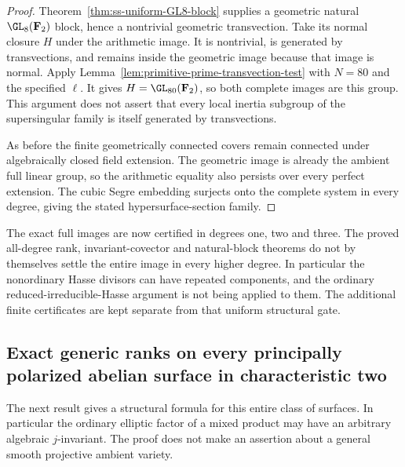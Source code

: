 \begin{proof}
Theorem~\ref{thm:ss-uniform-GL8-block} supplies a geometric natural
$\GL_8(\mathbf F_2)$ block, hence a nontrivial geometric transvection.
Take its normal closure $H$ under the arithmetic image. It is nontrivial,
is generated by transvections, and remains inside the geometric image
because that image is normal. Apply
Lemma~\ref{lem:primitive-prime-transvection-test} with $N=80$ and the
specified $\ell$. It gives $H=\GL_{80}(\mathbf F_2)$, so both complete
images are this group. This argument does not assert that every local
inertia subgroup of the supersingular family is itself generated by
transvections.

As before the finite geometrically connected covers remain connected
under algebraically closed field extension. The geometric image is
already the ambient full linear group, so the arithmetic equality also
persists over every perfect extension. The cubic Segre embedding
surjects onto the complete system in every degree, giving the stated
hypersurface-section family.
\end{proof}

\begin{remark}\label{auto:A_monodromy:12aa8c66349f}

The exact full images are now certified in degrees one, two and three.
The proved all-degree rank, invariant-covector and natural-block theorems
do not by themselves settle the entire image in every higher degree.
In particular the nonordinary Hasse divisors can have repeated components,
and the ordinary reduced-irreducible-Hasse argument is not being applied
to them. The additional finite certificates are kept separate from that
uniform structural gate.
\end{remark}


\subsection{Exact generic ranks on every principally polarized abelian surface in characteristic two}
\label{sec:DE-A3-ppav-ranks}

The next result gives a structural formula for this entire class of
surfaces.  In particular the ordinary elliptic factor of a mixed product
may have an arbitrary algebraic $j$-invariant.  The proof does not make
an assertion about a general smooth projective ambient variety.

